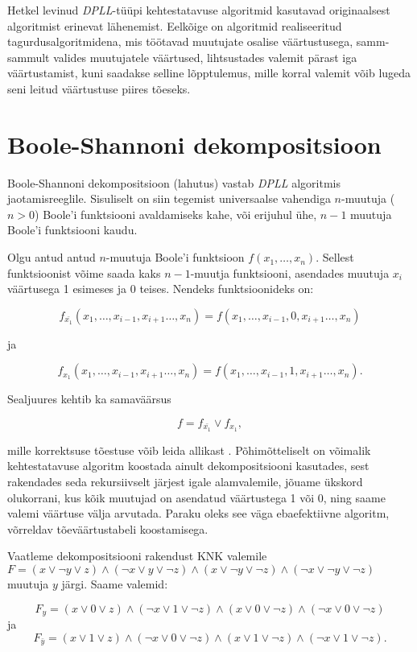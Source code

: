 Hetkel levinud \textit{DPLL}-tüüpi kehtestatavuse algoritmid kasutavad
originaalsest algoritmist erinevat lähenemist. Eelkõige on algoritmid
realiseeritud tagurdusalgoritmidena, mis töötavad muutujate osalise
väärtustusega, samm-sammult valides muutujatele väärtused, lihtsustades
valemit pärast iga väärtustamist, kuni saadakse selline lõpptulemus, mille 
korral valemit võib lugeda seni leitud väärtustuse piires tõeseks.


\section{Boole-Shannoni dekompositsioon}

Boole-Shannoni dekompositsioon (lahutus) vastab \textit{DPLL} algoritmis
jaotamisreeglile. Sisuliselt on siin tegemist universaalse vahendiga
$n$-muutuja ($n>0$) Boole'i funktsiooni avaldamiseks kahe, või erijuhul ühe,
$n-1$ muutuja Boole'i funktsiooni kaudu.

Olgu antud antud $n$-muutuja Boole'i funktsioon $f(x_1,\dots,x_n)$. Sellest
funktsioonist võime saada kaks $n-1$-muutja funktsiooni, asendades muutuja
$x_i$ väärtusega 1 esimeses ja 0 teises. Nendeks funktsioonideks on:

$$f_{\bar{x_1}}(x_1,\dots,x_{i-1},x_{i+1}\dots,x_n)=f(x_1,\dots,x_{i-1},0,x_{i+1}\dots,x_n)$$

ja

$$f_{x_1}(x_1,\dots,x_{i-1},x_{i+1}\dots,x_n)=f(x_1,\dots,x_{i-1},1,x_{i+1}\dots,x_n).$$

Sealjuures kehtib ka samaväärsus

$$f=f_{\bar{x_1}}\vee f_{x_1},$$

mille korrektsuse tõestuse võib leida allikast \cite{tombak07}. Põhimõtteliselt
on võimalik kehtestatavuse algoritm koostada ainult dekompositsiooni kasutades,
sest rakendades seda rekursiivselt järjest igale alamvalemile, jõuame ükskord
olukorrani, kus kõik muutujad on asendatud väärtustega 1 või 0, ning saame
valemi väärtuse välja arvutada. Paraku oleks see väga ebaefektiivne algoritm,
võrreldav tõeväärtustabeli koostamisega.

Vaatleme dekompositsiooni rakendust KNK valemile $F=(x\vee\neg y\vee z) \wedge
(\neg x\vee y\vee\neg z) \wedge (x\vee\neg y\vee\neg z) \wedge (\neg x\vee\neg
y\vee\neg z)$ muutuja $y$ järgi. Saame valemid:

$$F_y=(x\vee 0\vee z) \wedge
(\neg x\vee 1\vee\neg z) \wedge (x\vee 0\vee\neg z) \wedge (\neg x\vee 0\vee\neg
z)$$
ja
$$F_{\bar{y}}=(x\vee 1\vee z) \wedge
(\neg x\vee 0\vee\neg z) \wedge (x\vee 1\vee\neg z) \wedge (\neg x\vee 1\vee\neg
z).$$

